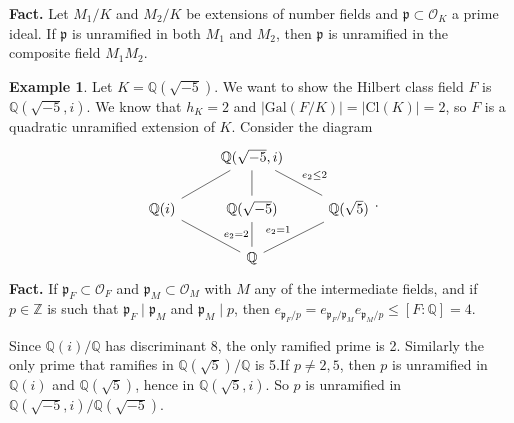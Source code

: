\documentclass{article}
\theoremstyle{definition}
\newtheorem{example}{Example}[section]
\begin{document}
\textbf{Fact.} Let $M_1/K$ and $M_2/K$ be extensions of number fields and $\mathfrak{p} \subset \mathcal{O}_K$ a prime ideal. If $\mathfrak{p}$ is unramified in both $M_1$ and $M_2$, then $\mathfrak{p}$ is unramified in the composite field $M_1M_2$.
\begin{example}
    Let $K = \mathbb{Q}(\sqrt{-5})$. We want to show the Hilbert class field $F$ is $\mathbb{Q}(\sqrt{-5},i)$. We know that $h_K=2$ and $\left|\text{Gal}(F/K)\right|=\left|\text{Cl}(K)\right|=2$, so $F$ is a quadratic unramified extension of $K$. Consider the diagram
    $$\begin{tikzcd}
        & \mathbb{Q}(\sqrt{-5},i) & \\
        \mathbb{Q}(i) & \mathbb{Q}(\sqrt{-5}) & \mathbb{Q}(\sqrt{5}) \\
        & \mathbb{Q} &
        \arrow[from=1-2, to=2-1, dash]
        \arrow[from=1-2, to=2-2, dash]
        \arrow["e_2\le 2", from=1-2, to=2-3, dash]
        \arrow[from=3-2, to=2-1, dash]
        \arrow["e_2 = 2", from=3-2, to=2-2, dash]
        \arrow["e_2 = 1", from=3-2, to=2-3, dash]
    \end{tikzcd}.$$
    \textbf{Fact.} If $\mathfrak{p}_F \subset \mathcal{O}_F$ and $\mathfrak{p}_M \subset \mathcal{O}_M$ with $M$ any of the intermediate fields, and if $p \in \mathbb{Z}$ is such that $\mathfrak{p}_F \mid \mathfrak{p}_M$ and $\mathfrak{p}_M \mid p$, then $e_{\mathfrak{p}_F/p} = e_{\mathfrak{p}_F/\mathfrak{p}_M}e_{\mathfrak{p}_M/p}\le [F:\mathbb{Q}] = 4$.

    \vspace{1mm}
     
    Since $\mathbb{Q}(i)/\mathbb{Q}$ has discriminant 8, the only ramified prime is 2. Similarly the only prime that ramifies in $\mathbb{Q}(\sqrt{5})/\mathbb{Q}$ is 5.If $p \neq 2,5$, then $p$ is unramified in $\mathbb{Q}(i)$ and $\mathbb{Q}(\sqrt{5})$, hence in $\mathbb{Q}(\sqrt{5},i)$. So $p$ is unramified in $\mathbb{Q}(\sqrt{-5},i)/\mathbb{Q}(\sqrt{-5})$.
    \vspace{1mm}
     

\end{example}
\end{document}
